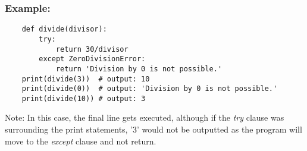 \subsubsection{Example:}
\begin{verbatim}
    def divide(divisor):
        try:
            return 30/divisor
        except ZeroDivisionError:
            return 'Division by 0 is not possible.'
    print(divide(3))  # output: 10
    print(divide(0))  # output: 'Division by 0 is not possible.'
    print(divide(10)) # output: 3
\end{verbatim}
Note: In this case, the final line gets executed, although if the \textit{try} clause was surrounding the print statements, '3' would not be outputted as the program will move to the \textit{except} clause and not return.